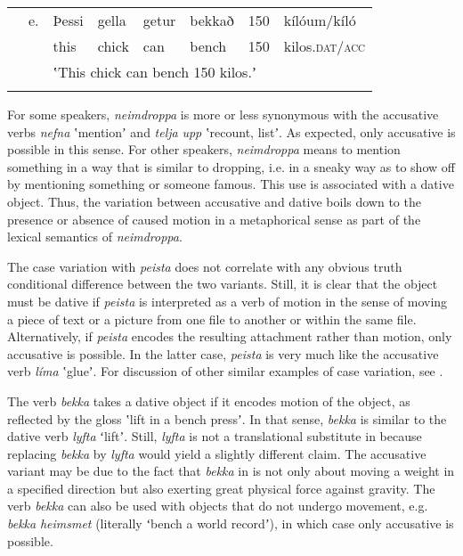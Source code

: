 \documentclass[output=paper,modfonts,nonflat]{langsci/langscibook}
\begin{document}
\tabletail{}
\tablelasttail{}
\begin{tabularx}{\textwidth}{XXXXXXXX} & e. & Þessi & gella & getur & bekkað & 150 & kílóum/kíló\\
\lsptoprule
&  & this & chick & can & bench & 150 & kilos.\textsc{dat/acc}\\
&  & \multicolumn{6}{X}{ʽThis chick can bench 150 kilos.ʼ}\\
\lspbottomrule
\end{tabularx}
For some speakers, \textit{neimdroppa} is more or less synonymous with the accusative verbs \textit{nefna} ʽmentionʼ and \textit{telja} \textit{upp} ʽrecount, listʼ. As expected, only accusative is possible in this sense. For other speakers,  \textit{neimdroppa} means to mention something in a way that is similar to dropping, i.e. in a sneaky way as to show off by mentioning something or someone famous. This use is associated with a dative object. Thus, the variation between accusative and dative boils down to the presence or absence of caused motion in a metaphorical sense as part of the lexical semantics of \textit{neimdroppa}.

The case variation with \textit{peista} does not correlate with any obvious truth conditional difference between the two variants. Still, it is clear that the object must be dative if \textit{peista} is interpreted as a verb of motion in the sense of moving a piece of text or a picture from one file to another or within the same file. Alternatively, if \textit{peista} encodes the resulting attachment rather than motion, only accusative is possible. In the latter case, \textit{peista} is very much like the accusative verb \textit{líma} ʽglueʼ. For discussion of other similar examples of case variation, see \citet{Jónsson2013a}.

The verb \textit{bekka} takes a dative object if it encodes motion of the object, as reflected by the gloss ʽlift in a bench pressʼ. In that sense, \textit{bekka} is similar to the dative verb \textit{lyfta} ʻliftʼ. Still, \textit{lyfta} is not a translational substitute in  because replacing \textit{bekka} by \textit{lyfta} would yield a slightly different claim. The accusative variant may be due to the fact that \textit{bekka} in  is not only about moving a weight in a specified direction but also exerting great physical force against gravity. The verb \textit{bekka} can also be used with objects that do not undergo movement, e.g. \textit{bekka} \textit{heimsmet} (literally ʻbench a world recordʼ), in which case only accusative is possible. 
\end{document}
